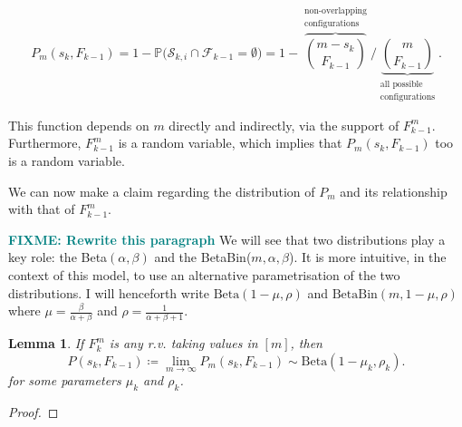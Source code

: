 \documentclass[american, abstract=on]{scrartcl}
\theoremstyle{plain}
\newtheorem{lemma}{Lemma}
\renewcommand{\P}{\mathbb{P}}
\newcommand{\Beta}{\text{Beta}}
\newcommand{\Bin}{\text{Bin}}
\newcommand\notes[1]{\textcolor{teal}{\footnotesize \textbf{#1}}}
\begin{document}
\begin{equation}
  P_m(s_k, F_{k-1}) = 1 - \P\big( \mathcal{S}_{k, i} \cap \mathcal{F}_{k - 1} = \emptyset \big) =  1 - \overbrace{\binom{m - s_k}{F_{k-1}}}^{\substack{\text{non-overlapping} \\ \text{configurations}}} \Bigg/ \underbrace{\binom{m}{F_{k-1}}}_{\substack{\text{all possible} \\ \text{configurations}}}. 
\end{equation}

This function depends on $m$ directly and indirectly, via the support of $F^m_{k-1}$. Furthermore, $F^m_{k - 1}$ is a random variable, which implies that $P_m(s_k, F_{k-1})$ too is a random variable. 

We can now make a claim regarding the distribution of $P_m$ and its relationship with that of $F^m_{k - 1}$. 

\notes{FIXME: Rewrite this paragraph}
We will see that two distributions play a key role: the Beta$(\alpha, \beta)$ and the BetaBin($m, \alpha, \beta$). It is more intuitive, in the context of this model, to use an alternative parametrisation of the two distributions. I will henceforth write $\Beta(1 - \mu, \rho)$ and $\Beta\Bin(m, 1 - \mu, \rho)$ where $\mu = \frac{\beta}{\alpha + \beta}$ and $\rho = \frac{1}{\alpha + \beta + 1}$.

\begin{lemma} \label{lemma:Ftop}
  If $F^m_k$ is any r.v. taking values in $[m]$, then \begin{equation*}P(s_k, F_{k - 1}) \coloneqq \lim_{m \rightarrow \infty} P_m(s_k, F_{k - 1}) \sim \Beta(1 - \mu_k, \rho_k).\end{equation*} for some parameters $\mu_k$ and $\rho_k$.
\end{lemma}

\begin{proof}
  
\end{proof}
\end{document}
